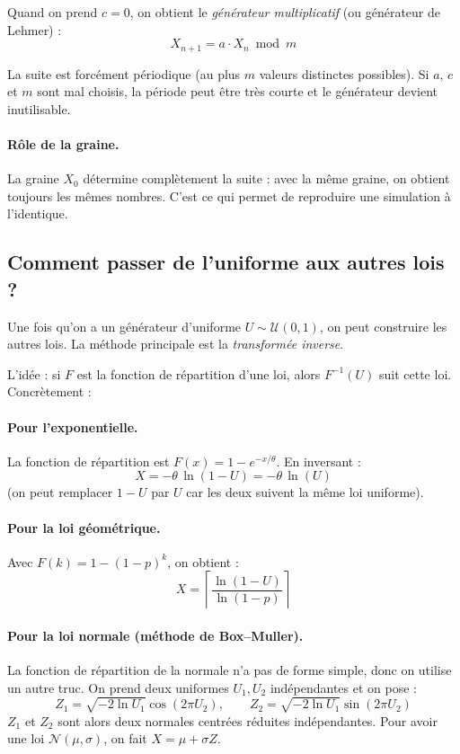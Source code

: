 \documentclass[11pt,a4paper]{article}
\begin{document}
Quand on prend $c = 0$, on obtient le \emph{g\'en\'erateur multiplicatif} (ou
g\'en\'erateur de Lehmer) :
\begin{equation*}
    X_{n+1} = a \cdot X_n \bmod m
\end{equation*}

La suite est forc\'ement p\'eriodique (au plus $m$ valeurs distinctes possibles).
Si $a$, $c$ et $m$ sont mal choisis, la p\'eriode peut \^etre tr\`es courte et
le g\'en\'erateur devient inutilisable.

\paragraph{R\^ole de la graine.}
La graine $X_0$ d\'etermine compl\`etement la suite : avec la m\^eme graine, on
obtient toujours les m\^emes nombres. C'est ce qui permet de reproduire une
simulation \`a l'identique.

\subsection{Comment passer de l'uniforme aux autres lois ?}

Une fois qu'on a un g\'en\'erateur d'uniforme $U \sim \mathcal{U}(0,1)$, on
peut construire les autres lois. La m\'ethode principale est la
\emph{transform\'ee inverse}.

L'id\'ee : si $F$ est la fonction de r\'epartition d'une loi, alors $F^{-1}(U)$
suit cette loi. Concr\`etement :

\paragraph{Pour l'exponentielle.}
La fonction de r\'epartition est $F(x) = 1 - e^{-x/\theta}$. En inversant :
\begin{equation*}
    X = -\theta \, \ln(1 - U) = -\theta \, \ln(U)
\end{equation*}
(on peut remplacer $1 - U$ par $U$ car les deux suivent la m\^eme loi
uniforme).

\paragraph{Pour la loi g\'eom\'etrique.}
Avec $F(k) = 1 - (1-p)^k$, on obtient :
\begin{equation*}
    X = \left\lceil \frac{\ln(1 - U)}{\ln(1 - p)} \right\rceil
\end{equation*}

\paragraph{Pour la loi normale (m\'ethode de Box--Muller).}
La fonction de r\'epartition de la normale n'a pas de forme simple, donc on
utilise un autre truc. On prend deux uniformes $U_1, U_2$ ind\'ependantes et
on pose :
\begin{equation*}
    Z_1 = \sqrt{-2 \ln U_1} \cos(2\pi U_2), \qquad
    Z_2 = \sqrt{-2 \ln U_1} \sin(2\pi U_2)
\end{equation*}
$Z_1$ et $Z_2$ sont alors deux normales centr\'ees r\'eduites
ind\'ependantes. Pour avoir une loi $\mathcal{N}(\mu, \sigma)$, on fait
$X = \mu + \sigma Z$.
\end{document}
